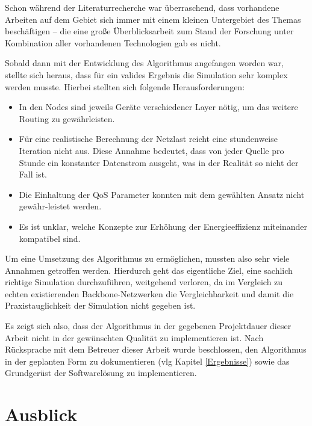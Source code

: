 \documentclass[12pt,titlepage]{article}
\begin{document}
Schon während der Literaturrecherche war überraschend, dass vorhandene Arbeiten auf dem Gebiet sich immer mit einem kleinen Untergebiet des Themas beschäftigen -- die eine große Überblicksarbeit zum Stand der Forschung unter Kombination aller vorhandenen Technologien gab es nicht.

Sobald dann mit der Entwicklung des Algorithmus angefangen worden war, stellte sich heraus, dass für ein valides Ergebnis die Simulation sehr komplex werden musste. Hierbei stellten sich folgende Herausforderungen:
\begin{itemize}
	\item In den Nodes sind jeweils Geräte verschiedener Layer nötig, um das weitere Routing zu gewährleisten. 
	\item Für eine realistische Berechnung der Netzlast reicht eine stundenweise Iteration nicht aus. Diese Annahme bedeutet, dass von jeder Quelle pro Stunde ein konstanter Datenstrom ausgeht, was in der Realität so nicht der Fall ist.
	\item Die Einhaltung der QoS Parameter konnten mit dem gewählten Ansatz nicht gewähr-leistet werden.
	\item Es ist unklar, welche Konzepte zur Erhöhung der Energieeffizienz miteinander kompatibel sind.
\end{itemize}

Um eine Umsetzung des Algorithmus zu ermöglichen, mussten also sehr viele Annahmen getroffen werden. Hierdurch geht das eigentliche Ziel, eine sachlich richtige Simulation durchzuführen, weitgehend verloren, da im Vergleich zu echten existierenden Backbone-Netzwerken die Vergleichbarkeit und damit die Praxistauglichkeit der Simulation nicht gegeben ist.

Es zeigt sich also, dass der Algorithmus in der gegebenen Projektdauer dieser Arbeit nicht in der gewünschten Qualität zu implementieren ist. Nach Rücksprache mit dem Betreuer dieser Arbeit wurde beschlossen, den Algorithmus in der geplanten Form zu dokumentieren (vlg Kapitel \ref{Ergebnisse}) sowie das Grundgerüst der Softwarelösung zu implementieren. 



\newpage
\section{Ausblick}
\end{document}
